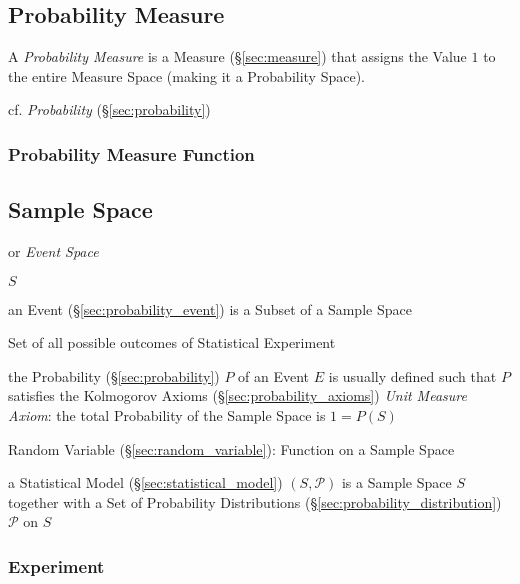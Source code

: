 \subsection{Probability Measure}\label{sec:probability_measure}

A \emph{Probability Measure} is a Measure (\S\ref{sec:measure}) that assigns the
Value $1$ to the entire Measure Space (making it a Probability Space).

cf. \emph{Probability} (\S\ref{sec:probability})



\subsubsection{Probability Measure Function}
\label{sec:probability_measure_function}



\subsection{Sample Space}\label{sec:sample_space}

or \emph{Event Space}

$S$

an Event (\S\ref{sec:probability_event}) is a Subset of a Sample Space

Set of all possible outcomes of Statistical Experiment

the Probability (\S\ref{sec:probability}) $P$ of an Event $E$ is usually
defined such that $P$ satisfies the Kolmogorov Axioms
(\S\ref{sec:probability_axioms}) \fist \emph{Unit Measure Axiom}: the
total Probability of the Sample Space is $1 = P(S)$

Random Variable (\S\ref{sec:random_variable}): Function on a Sample
Space

a Statistical Model (\S\ref{sec:statistical_model}) $(S,\mathcal{P})$ is a
Sample Space $S$ together with a Set of Probability Distributions
(\S\ref{sec:probability_distribution}) $\mathcal{P}$ on $S$



\subsubsection{Experiment}\label{sec:experiment}

